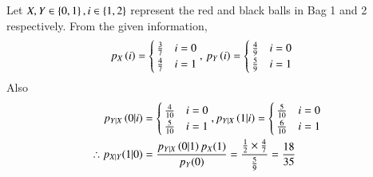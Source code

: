 Let $X,Y \in \left\{0,1\right\}, i \in \left\{1,2\right\}$ represent the red and black balls in Bag 1 and 2 respectively.    From the given information,
\begin{align}
	p_{X}\left(i\right)&= 
	\begin{cases}
		\frac{3}{7} & i=0 \\
		\frac{4}{7} & i=1
	\end{cases},\,
	p_{Y}\left(i\right)= 
	\begin{cases}
		\frac{4}{9} & i=0 \\
		\frac{5}{9} & i=1
	\end{cases}
\end{align}
Also 
\begin{align}
	p_{Y|X}\left(0|i\right)&= 
	\begin{cases}
		\frac{4}{10} & i=0 \\
		\frac{5}{10} & i=1
	\end{cases}
	,
	p_{Y|X}\left(1|i\right)= 
	\begin{cases}
		\frac{5}{10} & i=0 \\
		\frac{6}{10} & i=1
	\end{cases}
	\\
	\therefore p_{X|Y}(1|0) &= \frac{p_{Y|X}\left(0|1\right)p_X(1)}{p_Y(0)} = \frac{\frac{1}{2}\times \frac{4}{7}}{\frac{5}{9}} = \frac{18}{35}
\end{align}
%  
